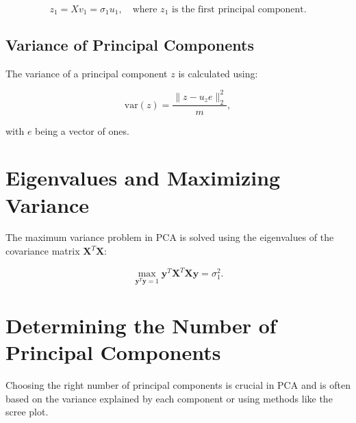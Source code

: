 \[
z_1 = Xv_1 = \sigma_1 u_1, \quad \text{where } z_1 \text{ is the first principal component.}
\]

\subsection{Variance of Principal Components}

The variance of a principal component \( z \) is calculated using:

\[
\text{var}(z) = \frac{\|z - u_z e\|_2^2}{m},
\]

with \( e \) being a vector of ones.

\section{Eigenvalues and Maximizing Variance}

The maximum variance problem in PCA is solved using the eigenvalues of the covariance matrix \( \mathbf{X}^T\mathbf{X} \):

\[
\max_{\mathbf{y}^T\mathbf{y}=1} \mathbf{y}^T\mathbf{X}^T\mathbf{X}\mathbf{y} = \sigma_1^2.
\]

\section{Determining the Number of Principal Components}

Choosing the right number of principal components is crucial in PCA and is often based on the variance explained by each component or using methods like the scree plot.
